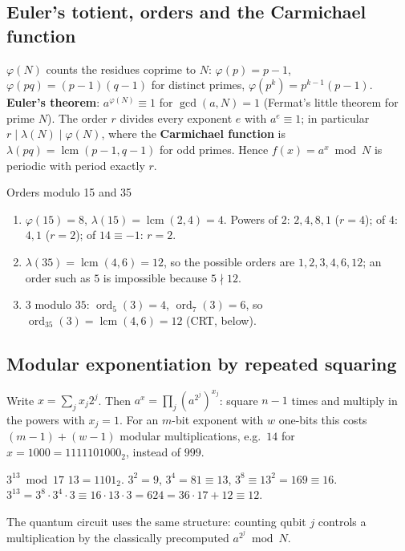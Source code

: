 \documentclass[11pt,a4paper,openany]{book}
\newcounter{wex}[chapter]
\newenvironment{steps}{\begin{enumerate}[label=\textbf{Step \arabic*.}, leftmargin=4.2em, itemsep=2pt]}{\end{enumerate}}
\begin{document}
\subsection{Euler's totient, orders and the Carmichael function}
$\varphi(N)$ counts the residues coprime to $N$: $\varphi(p) = p - 1$, $\varphi(pq) = (p - 1)(q - 1)$ for distinct primes, $\varphi(p^k) = p^{k-1}(p - 1)$.
\textbf{Euler's theorem}: $a^{\varphi(N)} \equiv 1$ for $\gcd(a, N) = 1$ (Fermat's little theorem for prime $N$). The order $r$ divides every exponent $e$
with $a^e \equiv 1$; in particular $r \mid \lambda(N) \mid \varphi(N)$, where the \textbf{Carmichael function} is $\lambda(pq) = \operatorname{lcm}(p - 1, q - 1)$ for odd
primes. Hence $f(x) = a^x \bmod N$ is periodic with period exactly $r$.

\begin{wexample}{Orders modulo 15 and 35}
\begin{steps}
\item $\varphi(15) = 8$, $\lambda(15) = \operatorname{lcm}(2, 4) = 4$. Powers of $2$: $2, 4, 8, 1$ ($r = 4$); of $4$: $4, 1$ ($r = 2$); of $14 \equiv -1$: $r = 2$.
\item $\lambda(35) = \operatorname{lcm}(4, 6) = 12$, so the possible orders are $1, 2, 3, 4, 6, 12$; an order such as $5$ is impossible because $5 \nmid 12$.
\item $3$ modulo $35$: $\operatorname{ord}_5(3) = 4$, $\operatorname{ord}_7(3) = 6$, so $\operatorname{ord}_{35}(3) = \operatorname{lcm}(4, 6) = 12$ (CRT, below).
\end{steps}
\end{wexample}

\subsection{Modular exponentiation by repeated squaring}
Write $x = \sum_jx_j2^j$. Then $a^x = \prod_j(a^{2^j})^{x_j}$: square $n - 1$ times and multiply in the powers with $x_j = 1$. For an $m$-bit exponent with
$w$ one-bits this costs $(m - 1) + (w - 1)$ modular multiplications, e.g.\ $14$ for $x = 1000 = 1111101000_2$, instead of $999$.

\begin{wexample}{$3^{13} \bmod 17$}
$13 = 1101_2$. $3^2 = 9$, $3^4 = 81 \equiv 13$, $3^8 \equiv 13^2 = 169 \equiv 16$. $3^{13} = 3^8\cdot3^4\cdot3 \equiv 16\cdot13\cdot3 = 624 = 36\cdot17 + 12 \equiv 12$.
\end{wexample}
The quantum circuit uses the same structure: counting qubit $j$ controls a multiplication by the classically precomputed $a^{2^j} \bmod N$.
\end{document}
